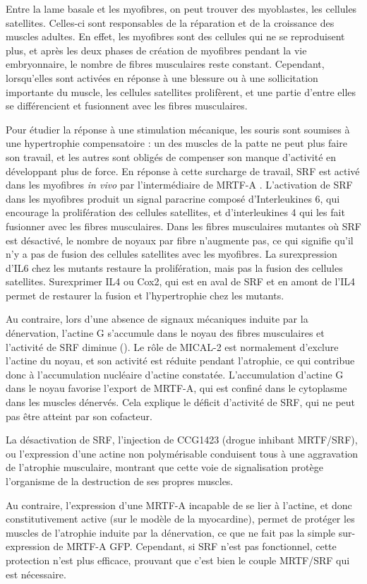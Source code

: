 Entre la lame basale et les myofibres, on peut trouver des myoblastes, les cellules satellites. Celles-ci sont responsables de la réparation et de la croissance des muscles adultes. 
En effet, les myofibres sont des cellules qui ne se reproduisent plus, et après les deux phases de création de myofibres pendant la vie embryonnaire, le nombre de fibres musculaires reste constant. 
Cependant, lorsqu'elles sont activées en réponse à une blessure ou à une sollicitation importante du muscle, les cellules satellites prolifèrent, et une partie d'entre elles se différencient et fusionnent avec les fibres musculaires. 

Pour étudier la réponse à une stimulation mécanique, les souris sont soumises à une hypertrophie compensatoire : un des muscles de la patte ne peut plus faire son travail, et les autres sont obligés de compenser son manque d'activité en développant plus de force. En réponse à cette surcharge de travail, SRF est activé dans les myofibres \textit{in vivo} par l'intermédiaire de MRTF-A  \cite{guerci_srf-dependent_2012}. 
L'activation de SRF dans les myofibres produit un signal paracrine composé d'Interleukines 6, qui encourage la prolifération des cellules satellites, et d'interleukines 4 qui les fait fusionner avec les fibres musculaires. 
Dans les fibres musculaires mutantes où SRF est désactivé, le nombre de noyaux par fibre n'augmente pas, ce qui signifie qu'il n'y a pas de fusion des cellules satellites avec les myofibres. La surexpression d'IL6 chez les mutants restaure la prolifération, mais pas la fusion des cellules satellites. Surexprimer IL4 ou Cox2, qui est en aval de SRF et en amont de l'IL4 permet de restaurer la fusion et l'hypertrophie chez les mutants. 


Au contraire, lors d'une absence de signaux mécaniques induite par la dénervation, l'actine G s'accumule dans le noyau des fibres musculaires et l'activité de SRF diminue (\cite{collard_nuclear_2014}). Le rôle de MICAL-2 est normalement d'exclure l'actine du noyau, et son activité est réduite pendant l'atrophie, ce qui contribue donc à l'accumulation nucléaire d'actine constatée. 
L'accumulation d'actine G dans le noyau favorise l'export de MRTF-A, qui est confiné dans le cytoplasme dans les muscles dénervés. Cela explique le déficit d'activité de SRF, qui ne peut pas être atteint par son cofacteur. 

La désactivation de SRF, l'injection de CCG1423 (drogue inhibant MRTF/SRF), ou l'expression d'une actine non polymérisable conduisent tous à une aggravation de l'atrophie musculaire, montrant que cette voie de signalisation protège l'organisme de la destruction de ses propres muscles. 

Au contraire, l'expression d'une MRTF-A incapable de se lier à l'actine, et donc constitutivement active (sur le modèle de la myocardine), permet de protéger les muscles de l'atrophie induite par la dénervation, ce que ne fait pas la simple sur-expression de MRTF-A GFP. Cependant, si SRF n'est pas fonctionnel, cette protection n'est plus efficace, prouvant que c'est bien le couple MRTF/SRF qui est nécessaire. 


%
